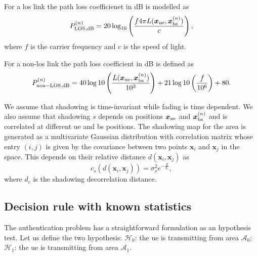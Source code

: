 \documentclass[draftcls,onecolumn,12pt]{IEEEtran}
\begin{document}
For a \ac{los} link the path loss coefficienet in dB is modelled as
\begin{equation}\label{eq:los}
    P_{\rm LOS,dB}^{(n)} = 20\log_{10}\left(\frac{f 4\pi L(\bm{x}_{\rm ue},\bm{x}_{\rm bs}^{(n)})}{c}\right),
\end{equation}
where $f$ is the carrier frequency and $c$ is the speed of light.

For a  non-\ac{los} link the path loss coefficient in dB is defined as
\begin{equation}
    P_{\rm non-LOS,dB}^{(n)} = 40\log10\left (\frac{L(\bm{x}_{\rm ue},\bm{x}_{\rm bs}^{(n)})}{10^3}\right ) + 21\log10\left(\frac{f}{10^6}\right) + 80.
\end{equation}

We assume that shadowing is time-invariant while fading is time dependent. We also assume that shadowing $s$ depends on positions $\bm{x}_{\rm ue}$ and $\bm{x}_{\rm bs}^{(n)}$ and is correlated at different \ac{ue} and \ac{bs} positions. The shadowing map for the area is generated as a multivariate Gaussian distribution with correlation matrix whose entry $(i,j)$ is given by the covariance between two points $\bm{x}_i$ and $\bm{x}_j$ in the space. This depends on their relative distance $d(\bm{x}_i,\bm{x}_j)$ as
\begin{equation}\label{eq: coor mat}
    c_s\left(d(\bm{x}_i,\bm{x}_j)\right) = \sigma_s^2e^{-\frac{d}{d_c}},
\end{equation}
where $d_c$ is the shadowing decorrelation distance. 

\subsection{Decision rule with known statistics}\label{sec:auth}
The authentication problem has a straightforward formulation as an hypothesis test. Let us define the two hypothesis: $\mathcal{H}_0$: the \ac{ue} is transmitting from area $\mathcal{A}_0$; $\mathcal{H}_1$: the \ac{ue} is transmitting from area $\mathcal{A}_1$.
\end{document}
